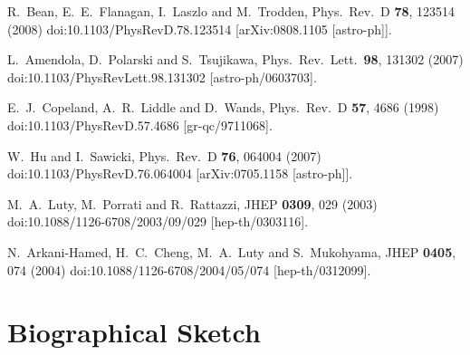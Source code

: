 \documentclass[useAMS,12pt]{article}
\begin{document}
\begin{thebibliography}{}
  R.~Bean, E.~E.~Flanagan, I.~Laszlo and M.~Trodden,
  Phys.\ Rev.\ D {\bf 78}, 123514 (2008)
  doi:10.1103/PhysRevD.78.123514
  [arXiv:0808.1105 [astro-ph]].


  L.~Amendola, D.~Polarski and S.~Tsujikawa,
  Phys.\ Rev.\ Lett.\  {\bf 98}, 131302 (2007)
  doi:10.1103/PhysRevLett.98.131302
  [astro-ph/0603703].


  E.~J.~Copeland, A.~R.~Liddle and D.~Wands,
  Phys.\ Rev.\ D {\bf 57}, 4686 (1998)
  doi:10.1103/PhysRevD.57.4686
  [gr-qc/9711068].


  W.~Hu and I.~Sawicki,
  Phys.\ Rev.\ D {\bf 76}, 064004 (2007)
  doi:10.1103/PhysRevD.76.064004
  [arXiv:0705.1158 [astro-ph]].


  M.~A.~Luty, M.~Porrati and R.~Rattazzi,
  JHEP {\bf 0309}, 029 (2003)
  doi:10.1088/1126-6708/2003/09/029
  [hep-th/0303116].


  N.~Arkani-Hamed, H.~C.~Cheng, M.~A.~Luty and S.~Mukohyama,
  JHEP {\bf 0405}, 074 (2004)
  doi:10.1088/1126-6708/2004/05/074
  [hep-th/0312099].
  
  \end{thebibliography}
\endgroup


\newpage
\section{Biographical Sketch}
\end{document}

